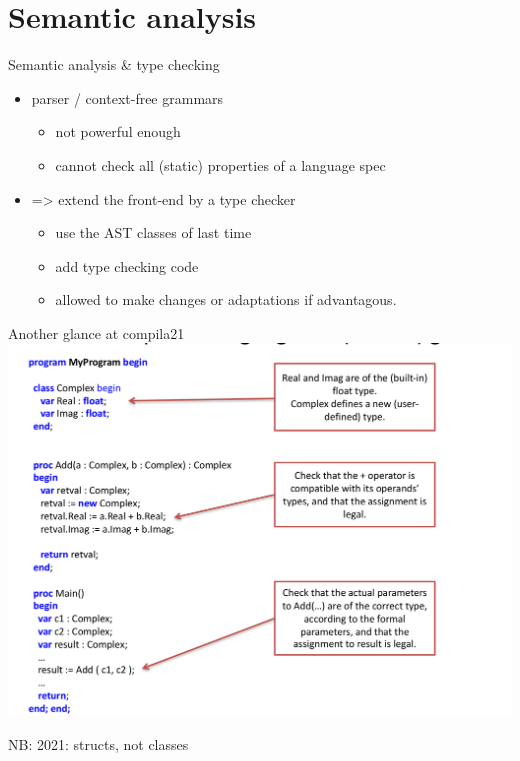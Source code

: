 \documentclass{beamer}
\begin{document}
\section{Semantic analysis}
\label{sec:org8ffe68e}
\begin{frame}[label={sec:orgf9512a3}]{Semantic analysis \& type checking}
\begin{itemize}
\item parser / context-free  grammars 
\begin{itemize}
\item not powerful enough
\item cannot check all (static) properties of a language spec
\end{itemize}

\item => extend the front-end by a type checker

\begin{itemize}
\item use the AST classes of last time
\item add type checking code
\item allowed to make \alert{changes} or adaptations if advantagous.
\end{itemize}
\end{itemize}
\end{frame}


\begin{frame}[label={sec:orga6f35b7}]{Another glance at compila21}
\includegraphics[width=\textwidth]{figures/snaps/compilaexample-checking}


NB: 2021: structs, not classes 
\end{frame}
\end{document}
